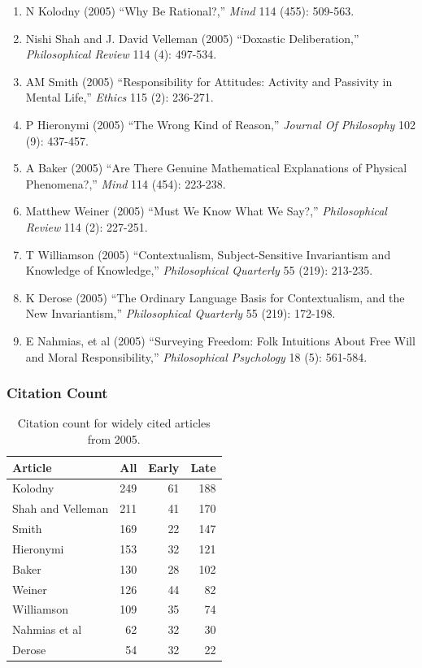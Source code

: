 \documentclass[
  10pt,
  letterpaper,
  DIV=11,
  numbers=noendperiod,
  twoside]{scrartcl}
\providecommand{\tightlist}{%
  \setlength{\itemsep}{0pt}\setlength{\parskip}{0pt}}\usepackage{longtable,booktabs,array}
\begin{document}
\begin{enumerate}
\def\labelenumi{\arabic{enumi}.}
\tightlist
\item
  N Kolodny (2005) ``Why Be Rational?,'' \emph{Mind} 114 (455): 509-563.
\item
  Nishi Shah and J. David Velleman (2005) ``Doxastic Deliberation,''
  \emph{Philosophical Review} 114 (4): 497-534.
\item
  AM Smith (2005) ``Responsibility for Attitudes: Activity and Passivity
  in Mental Life,'' \emph{Ethics} 115 (2): 236-271.
\item
  P Hieronymi (2005) ``The Wrong Kind of Reason,'' \emph{Journal Of
  Philosophy} 102 (9): 437-457.
\item
  A Baker (2005) ``Are There Genuine Mathematical Explanations of
  Physical Phenomena?,'' \emph{Mind} 114 (454): 223-238.
\item
  Matthew Weiner (2005) ``Must We Know What We Say?,''
  \emph{Philosophical Review} 114 (2): 227-251.
\item
  T Williamson (2005) ``Contextualism, Subject-Sensitive Invariantism
  and Knowledge of Knowledge,'' \emph{Philosophical Quarterly} 55 (219):
  213-235.
\item
  K Derose (2005) ``The Ordinary Language Basis for Contextualism, and
  the New Invariantism,'' \emph{Philosophical Quarterly} 55 (219):
  172-198.
\item
  E Nahmias, et al (2005) ``Surveying Freedom: Folk Intuitions About
  Free Will and Moral Responsibility,'' \emph{Philosophical Psychology}
  18 (5): 561-584.
\end{enumerate}

\subsubsection*{Citation Count}\label{sec-count-2005}

\begin{longtable}[]{@{}lrrr@{}}

\caption{\label{tbl-citation-count-2005}Citation count for widely cited
articles from 2005.}

\tabularnewline

\toprule\noalign{}
Article & All & Early & Late \\
\midrule\noalign{}
\endhead
\bottomrule\noalign{}
\endlastfoot
Kolodny & 249 & 61 & 188 \\
Shah and Velleman & 211 & 41 & 170 \\
Smith & 169 & 22 & 147 \\
Hieronymi & 153 & 32 & 121 \\
Baker & 130 & 28 & 102 \\
Weiner & 126 & 44 & 82 \\
Williamson & 109 & 35 & 74 \\
Nahmias et al & 62 & 32 & 30 \\
Derose & 54 & 32 & 22 \\

\end{longtable}
\end{document}
